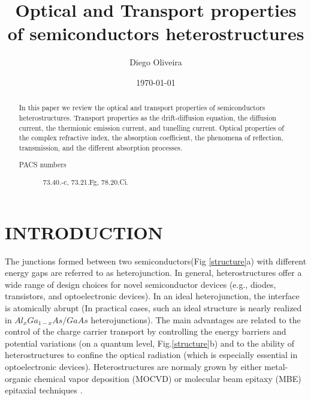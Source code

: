 \documentclass[%
reprint,
amsmath,amssymb,
aps,
]{revtex4-1}
\begin{document}
	
	
	\title{Optical and Transport properties of semiconductors heterostructures}%
	
	\author{Diego Oliveira}
	
	\date{\today}%
	
	\begin{abstract}
	In this paper we review the optical and transport properties of semiconductors heterostructures. Transport properties as the drift-diffusion equation, the diffusion current, the thermionic emission current, and tunelling current. Optical properties of the complex refractive index, the absorption coefficient, the phenomena of reflection, transmission, and the different absorption processes.
		
		\begin{description}
			\item[PACS numbers]
			73.40.-c, 73.21.Fg, 78.20.Ci.
		\end{description}
	\end{abstract}
	
\maketitle
\renewcommand{\thesection}{\arabic{section}}
\renewcommand{\thesubsection}{\thesection.\arabic{subsection}}
\renewcommand{\thesubsubsection}{\thesubsection.\arabic{subsubsection}}

\makeatletter
\renewcommand{\p@subsection}{}
\renewcommand{\p@subsubsection}{}
\makeatother
	
\section{INTRODUCTION}
The junctions formed between two semiconductors(Fig \ref{structure}a) with different energy gaps are referred to as heterojunction. In general, heterostructures offer a wide range of design choices for novel semiconductor devices (e.g., diodes, transistors, and optoelectronic devices). In an ideal heterojunction, the interface is atomically abrupt (In practical cases, such an ideal structure is nearly realized in $ Al_xGa_{1-x}As/GaAs $ heterojunctions). The main advantages are related to the control of the charge carrier transport by controlling the energy barriers and potential variations (on a quantum level, Fig.\ref{structure}b) and to the ability of heterostructures to confine the optical radiation (which is especially essential in optoelectronic devices). Heterostructures are normaly grown by either metal-organic chemical vapor deposition (MOCVD) or molecular beam epitaxy (MBE) epitaxial techniques \cite{yacobi}. 
\end{document}
